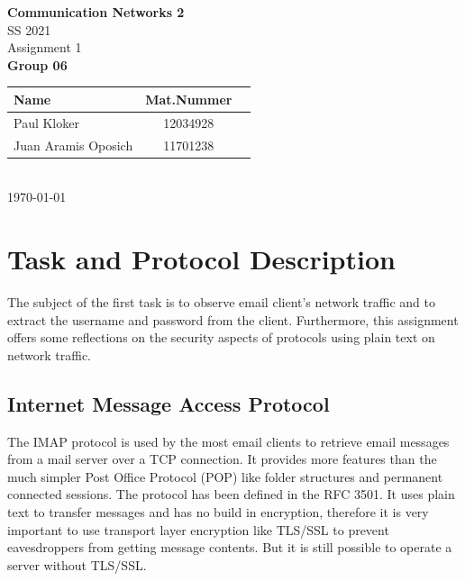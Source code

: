 \documentclass[parskip=full]{scrartcl}
\begin{document}
\begin{titlepage}
    \centering
    \vspace*{2cm}
    {\Huge \textbf{Communication Networks 2}}\\
    SS 2021\\
    \vspace*{1cm}
    {\Large Assignment 1}
    \\\vspace*{3cm}
    {\Large \textbf{Group 06}}\\
    \vspace*{1cm}
    {\large 
        \begin{tabular}{l c c}
            Name & Mat.Nummer \\ \hline
            Paul Kloker & 12034928 \\
            Juan Aramis Oposich & 11701238
        \end{tabular}
    }
    \\\vspace*{7cm}
    \today
\end{titlepage}

\section{Task and Protocol Description} \label{sec:task}

The subject of the first task is to observe email client’s network traffic and to extract the username and password from the client. Furthermore, this assignment offers some reflections on the security aspects of protocols using plain text on network traffic.

\subsection{Internet Message Access Protocol}
The IMAP protocol is used by the most email clients to retrieve email messages from a mail server over a TCP connection. It provides more features than the much simpler Post Office Protocol (POP) like folder structures and permanent connected sessions. The protocol has been defined in the RFC 3501. 
It uses plain text to transfer messages and has no build in encryption, therefore it is very important to use transport layer encryption like TLS/SSL to prevent eavesdroppers from getting message contents. But it is still possible to operate a server without TLS/SSL.
\end{document}

